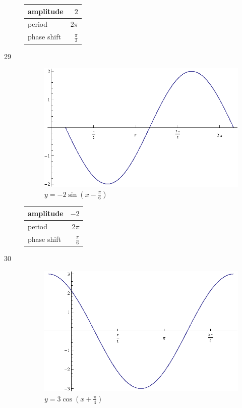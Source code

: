 \documentclass{exam}
\begin{document}
\begin{description}
        \begin{tabular}[H]{lr}
          \toprule
          amplitude & $2$ \\
          \midrule
          period & $2 \pi$ \\
          \midrule
          phase shift & $\frac{\pi}{3}$ \\
          \bottomrule
        \end{tabular}

      \item[29]
        \begin{figure}[H]
          \centering
          \includegraphics[scale=0.8]{exercise29.eps}
          \caption{$y = - 2 \sin \left( x - \frac{\pi}{6} \right)$}
        \end{figure}

        \begin{tabular}[H]{lr}
          \toprule
          amplitude & $-2$ \\
          \midrule
          period & $2 \pi$ \\
          \midrule
          phase shift & $\frac{\pi}{6}$ \\
          \bottomrule
        \end{tabular}

      \item[30]
        \begin{figure}[H]
          \centering
          \includegraphics[scale=0.8]{exercise30.eps}
          \caption{$y = 3 \cos \left( x + \frac{\pi}{4} \right)$}
        \end{figure}


\end{description}
\end{document}

